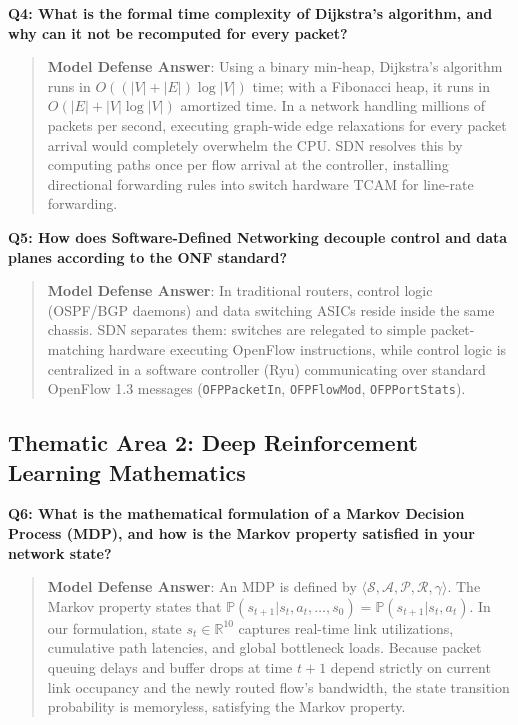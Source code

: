 \noindent\textbf{Q4: What is the formal time complexity of Dijkstra's algorithm, and why can it not be recomputed for every packet?}
\begin{quote}
\small
\textbf{Model Defense Answer}: Using a binary min-heap, Dijkstra's algorithm runs in $O((|V| + |E|) \log |V|)$ time; with a Fibonacci heap, it runs in $O(|E| + |V| \log |V|)$ amortized time. In a network handling millions of packets per second, executing graph-wide edge relaxations for every packet arrival would completely overwhelm the CPU. SDN resolves this by computing paths once per flow arrival at the controller, installing directional forwarding rules into switch hardware TCAM for line-rate forwarding.
\end{quote}

\noindent\textbf{Q5: How does Software-Defined Networking decouple control and data planes according to the ONF standard?}
\begin{quote}
\small
\textbf{Model Defense Answer}: In traditional routers, control logic (OSPF/BGP daemons) and data switching ASICs reside inside the same chassis. SDN separates them: switches are relegated to simple packet-matching hardware executing OpenFlow instructions, while control logic is centralized in a software controller (Ryu) communicating over standard OpenFlow 1.3 messages (\texttt{OFPPacketIn}, \texttt{OFPFlowMod}, \texttt{OFPPortStats}).
\end{quote}

\subsection{Thematic Area 2: Deep Reinforcement Learning Mathematics}

\noindent\textbf{Q6: What is the mathematical formulation of a Markov Decision Process (MDP), and how is the Markov property satisfied in your network state?}
\begin{quote}
\small
\textbf{Model Defense Answer}: An MDP is defined by $\langle \mathcal{S}, \mathcal{A}, \mathcal{P}, \mathcal{R}, \gamma \rangle$. The Markov property states that $\mathbb{P}(s_{t+1}|s_t, a_t, \dots, s_0) = \mathbb{P}(s_{t+1}|s_t, a_t)$. In our formulation, state $s_t \in \mathbb{R}^{10}$ captures real-time link utilizations, cumulative path latencies, and global bottleneck loads. Because packet queuing delays and buffer drops at time $t+1$ depend strictly on current link occupancy and the newly routed flow's bandwidth, the state transition probability is memoryless, satisfying the Markov property.
\end{quote}

